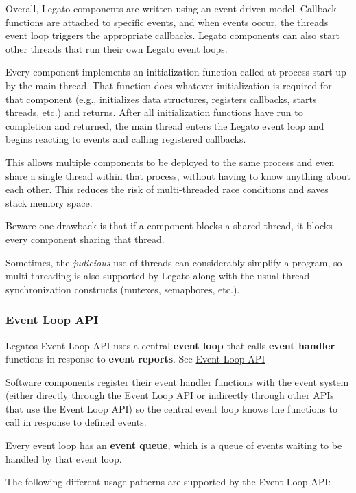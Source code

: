 Overall, Legato components are written using an event-\/driven model. Callback functions are attached to specific events, and when events occur, the thread\textquotesingle{}s event loop triggers the appropriate callbacks. Legato components can also start other threads that run their own Legato event loops.

Every component implements an initialization function called at process start-\/up by the main thread. That function does whatever initialization is required for that component (e.\+g., initializes data structures, registers callbacks, starts threads, etc.) and returns. After all initialization functions have run to completion and returned, the main thread enters the Legato event loop and begins reacting to events and calling registered callbacks.

This allows multiple components to be deployed to the same process and even share a single thread within that process, without having to know anything about each other. This reduces the risk of multi-\/threaded race conditions and saves stack memory space.

Beware one drawback is that if a component blocks a shared thread, it blocks every component sharing that thread.

Sometimes, the {\itshape judicious} use of threads can considerably simplify a program, so multi-\/threading is also supported by Legato along with the usual thread synchronization constructs (mutexes, semaphores, etc.).\hypertarget{basic_events_basicEvents_eventLoop}{}\subsubsection{Event Loop A\+P\+I}\label{basic_events_basicEvents_eventLoop}
Legato\textquotesingle{}s Event Loop A\+P\+I uses a central {\bfseries  event loop } that calls {\bfseries  event handler } functions in response to {\bfseries event reports}. See \hyperlink{c_eventLoop}{Event Loop A\+P\+I}

Software components register their event handler functions with the event system (either directly through the Event Loop A\+P\+I or indirectly through other A\+P\+Is that use the Event Loop A\+P\+I) so the central event loop knows the functions to call in response to defined events.

Every event loop has an {\bfseries event queue}, which is a queue of events waiting to be handled by that event loop.

The following different usage patterns are supported by the Event Loop A\+P\+I\+:


